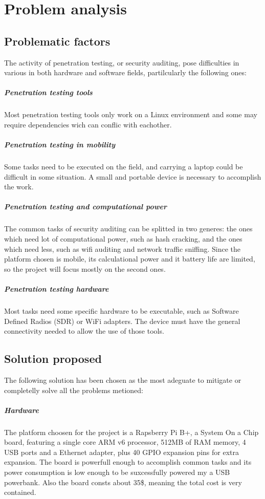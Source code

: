 \documentclass[../PiTest.tex]{subfiles}
\begin{document}
\section{Problem analysis}

    \subsection{Problematic factors}

    The activity of penetration testing, or security auditing, pose difficulties in various in both hardware and software fields, partilcularly the following ones:

    \subparagraph{Penetration testing tools}
        Most penetration testing tools only work on a Linux environment and some may require dependencies wich can conflic with eachother.    

	\subparagraph{Penetration testing in mobility}
        Some tasks need to be executed on the field, and carrying a laptop could be difficult in some situation.
        A small and portable device is necessary to accomplish the work.

    \subparagraph{Penetration testing and computational power}
        The common tasks of security auditing can be splitted in two generes: the ones which need lot of computational power, such as hash cracking, and the ones which need less, such as wifi auditing and network traffic sniffing.
        Since the platform chosen is mobile, its calculational power and it battery life are limited, so the project will focus mostly on the second ones. 
	
    \subparagraph{Penetration testing hardware}
        Most tasks need some specific hardware to be executable, such as Software Defined Radios (SDR) or WiFi adapters. The device must have the general connectivity needed to allow the use of those tools.


	\subsection{Solution proposed}
        The following solution has been chosen as the most adeguate to mitigate or completelly solve all the problems metioned:
        
        \subparagraph{Hardware}
            The platform choosen for the project is a Rapsberry Pi B+, a System On a Chip board, featuring a single core ARM v6 processor, 512MB of RAM memory, 4 USB ports and a Ethernet adapter, plus 40 GPIO expansion pins for extra expansion. The board is powerfull enough to accomplish common tasks and its power consumption is low enough to be suxcessfully powered my a USB powerbank. Also the board consts about 35\$, meaning the total cost is very contained.
        
\end{document}
